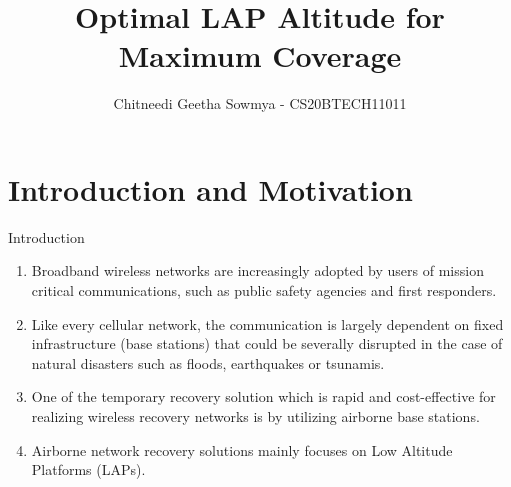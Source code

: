 \documentclass{beamer}
\title{Optimal LAP Altitude for Maximum Coverage}
\author{Chitneedi Geetha Sowmya - CS20BTECH11011}
\begin{document}
\begin{frame}
\titlepage
\end{frame}





\section{Introduction and Motivation}

\begin{frame}{Introduction}
\begin{enumerate}
    \item Broadband wireless networks are increasingly adopted by users of mission critical communications, such as public safety agencies and first responders.
    \item Like every cellular network, the communication is largely dependent on fixed infrastructure (base stations) that could be severally disrupted in the case of natural disasters such as floods, earthquakes or tsunamis.
    \item One of the temporary recovery solution which is rapid and cost-effective for realizing wireless recovery networks is by utilizing airborne base stations.
    \item Airborne network recovery solutions mainly focuses on Low Altitude Platforms (LAPs).
\end{enumerate}
\end{frame}
\end{document}
